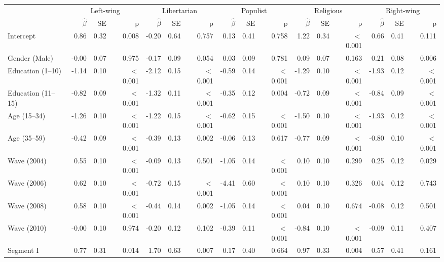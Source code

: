 \documentclass[12pt,letter]{article}\usepackage[]{graphicx}\usepackage[]{xcolor}
\begin{document}
\clearpage
\begin{table}
\centering
\begingroup\scriptsize
\begin{tabular}{lrrrrrrrrrrrrrrr}
  \toprule
  & \multicolumn{3}{c}{Left-wing}& \multicolumn{3}{c}{Libertarian}& \multicolumn{3}{c}{Populist}& \multicolumn{3}{c}{Religious}& \multicolumn{3}{c}{Right-wing}\\ \cmidrule{2-16} & $\hat{\beta}$ & SE & p & $\hat{\beta}$ & SE & p & $\hat{\beta}$ & SE & p & $\hat{\beta}$ & SE & p & $\hat{\beta}$ & SE & p \\ \midrule
Intercept & 0.86 & 0.32 & 0.008 & -0.20 & 0.64 & 0.757 & 0.13 & 0.41 & 0.758 & 1.22 & 0.34 & $<$0.001 & 0.66 & 0.41 & 0.111 \\ 
  Gender (Male) & -0.00 & 0.07 & 0.975 & -0.17 & 0.09 & 0.054 & 0.03 & 0.09 & 0.781 & 0.09 & 0.07 & 0.163 & 0.21 & 0.08 & 0.006 \\ 
  Education (1--10) & -1.14 & 0.10 & $<$0.001 & -2.12 & 0.15 & $<$0.001 & -0.59 & 0.14 & $<$0.001 & -1.29 & 0.10 & $<$0.001 & -1.93 & 0.12 & $<$0.001 \\ 
  Education (11--15) & -0.82 & 0.09 & $<$0.001 & -1.32 & 0.11 & $<$0.001 & -0.35 & 0.12 & 0.004 & -0.72 & 0.09 & $<$0.001 & -0.84 & 0.09 & $<$0.001 \\ 
  Age (15--34) & -1.26 & 0.10 & $<$0.001 & -1.22 & 0.15 & $<$0.001 & -0.62 & 0.15 & $<$0.001 & -1.50 & 0.10 & $<$0.001 & -1.93 & 0.12 & $<$0.001 \\ 
  Age (35--59) & -0.42 & 0.09 & $<$0.001 & -0.39 & 0.13 & 0.002 & -0.06 & 0.13 & 0.617 & -0.77 & 0.09 & $<$0.001 & -0.80 & 0.10 & $<$0.001 \\ 
  Wave (2004) & 0.55 & 0.10 & $<$0.001 & -0.09 & 0.13 & 0.501 & -1.05 & 0.14 & $<$0.001 & 0.10 & 0.10 & 0.299 & 0.25 & 0.12 & 0.029 \\ 
  Wave (2006) & 0.62 & 0.10 & $<$0.001 & -0.72 & 0.15 & $<$0.001 & -4.41 & 0.60 & $<$0.001 & 0.10 & 0.10 & 0.326 & 0.04 & 0.12 & 0.743 \\ 
  Wave (2008) & 0.58 & 0.10 & $<$0.001 & -0.44 & 0.14 & 0.002 & -1.05 & 0.14 & $<$0.001 & 0.04 & 0.10 & 0.674 & -0.08 & 0.12 & 0.501 \\ 
  Wave (2010) & -0.00 & 0.10 & 0.974 & -0.20 & 0.12 & 0.102 & -0.39 & 0.11 & $<$0.001 & -0.84 & 0.10 & $<$0.001 & -0.09 & 0.11 & 0.407 \\ 
  Segment I & 0.77 & 0.31 & 0.014 & 1.70 & 0.63 & 0.007 & 0.17 & 0.40 & 0.664 & 0.97 & 0.33 & 0.004 & 0.57 & 0.41 & 0.161 \\ 

\end{tabular}
\end{table}
\end{document}
